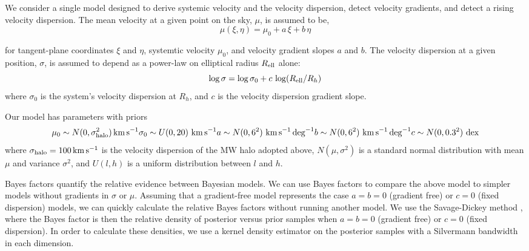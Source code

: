 We consider a single model designed to derive systemic velocity and the
velocity dispersion, detect velocity gradients, and detect a rising
velocity dispersion. The mean velocity at a given point on the sky,
\(\mu\), is assumed to be, \begin{equation}{
\mu(\xi, \eta) = \mu_0 + a\,\xi + b\,\eta
}\end{equation}

for tangent-plane coordinates \(\xi\) and \(\eta\), systemtic velocity
\(\mu_0\), and velocity gradient slopes \(a\) and \(b\). The velocity
dispersion at a given position, \(\sigma\), is assumed to depend as a
power-law on elliptical radius \(R_{\rm ell}\) alone: \begin{equation}{
\log \sigma = \log \sigma_0 + c\,\log(R_{\rm ell} / R_h)
}\end{equation} where \(\sigma_0\) is the system's velocity dispersion
at \(R_h\), and \(c\) is the velocity dispersion gradient slope.

Our model has parameters with priors \begin{equation}{
\mu_{0} \sim N(0, \sigma^2_{\rm halo}) \,{\rm km\,s^{-1}}\\
\sigma_{0} \sim U(0, 20)\ {\rm km\,s^{-1}}\\
a \sim N(0, 6^2)\ {\rm km\,s^{-1}}\,{\rm deg}^{-1}\\
b \sim N(0, 6^2)\ {\rm km\,s^{-1}}\,{\rm deg}^{-1}\\
c\sim N(0, 0.3^2)\ {\rm dex} \\
}\end{equation} where \(\sigma_{\rm halo} = 100\,{\rm km\,s^{-1}}\) is
the velocity dispersion of the MW halo adopted above,
\(N(\mu, \sigma^2)\) is a standard normal distribution with mean \(\mu\)
and variance \(\sigma^2\), and \(U(l, h)\) is a uniform distribution
between \(l\) and \(h\).

Bayes factors quantify the relative evidence between Bayesian models. We
can use Bayes factors to compare the above model to simpler models
without gradients in \(\sigma\) or \(\mu\). Assuming that a
gradient-free model represents the case \(a=b=0\) (gradient free) or
\(c=0\) (fixed dispersion) models, we can quickly calculate the relative
Bayes factors without running another model. We use the Savage-Dickey
method \citep{dickey+lientz1970}, where the Bayes factor is then the
relative density of posterior versus prior samples when \(a=b=0\)
(gradient free) or \(c=0\) (fixed dispersion). In order to calculate
these densities, we use a kernel density estimator on the posterior
samples with a Silvermann bandwidth in each dimension.


